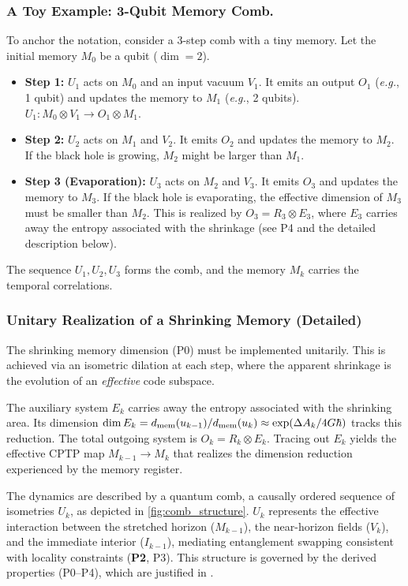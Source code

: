 \documentclass[11pt,a4paper]{article}
\newcommand{\Ptwo}{\textbf{P2}\xspace}
\newcommand{\eg}{\textit{e.g.}\xspace}
\theoremstyle{plain}
\theoremstyle{definition}
\theoremstyle{remark}
\begin{document}
\subsubsection{A Toy Example: 3-Qubit Memory Comb.}
To anchor the notation, consider a 3-step comb with a tiny memory. Let the initial memory $M_0$ be a qubit ($\dim=2$).
\begin{itemize}
    \item \textbf{Step 1:} $U_1$ acts on $M_0$ and an input vacuum $V_1$. It emits an output $O_1$ (\eg, 1 qubit) and updates the memory to $M_1$ (\eg, 2 qubits). $U_1: M_0 \otimes V_1 \to O_1 \otimes M_1$.
    \item \textbf{Step 2:} $U_2$ acts on $M_1$ and $V_2$. It emits $O_2$ and updates the memory to $M_2$. If the black hole is growing, $M_2$ might be larger than $M_1$.
    \item \textbf{Step 3 (Evaporation):} $U_3$ acts on $M_2$ and $V_3$. It emits $O_3$ and updates the memory to $M_3$. If the black hole is evaporating, the effective dimension of $M_3$ must be smaller than $M_2$. This is realized by $O_3 = R_3 \otimes E_3$, where $E_3$ carries away the entropy associated with the shrinkage (see P4 and the detailed description below).
\end{itemize}
The sequence $U_1, U_2, U_3$ forms the comb, and the memory $M_k$ carries the temporal correlations.

\subsubsection{Unitary Realization of a Shrinking Memory (Detailed)}
The shrinking memory dimension (P0) must be implemented unitarily. This is achieved via an isometric dilation at each step, where the apparent shrinkage is the evolution of an \emph{effective} code subspace.

The auxiliary system $E_k$ carries away the entropy associated with the shrinking area. Its dimension $\dim E_k = d_{\rm mem}(u_{k-1}) / d_{\rm mem}(u_k) \approx \exp(\Delta A_k / 4G\hbar)$ tracks this reduction. The total outgoing system is $O_k = R_k \otimes E_k$. Tracing out $E_k$ yields the effective CPTP map $M_{k-1}\!\to\!M_k$ that realizes the dimension reduction experienced by the memory register.

The dynamics are described by a quantum comb, a causally ordered sequence of isometries $U_k$, as depicted in \cref{fig:comb_structure}. $U_k$ represents the effective interaction between the stretched horizon ($M_{k-1}$), the near-horizon fields ($V_k$), and the immediate interior ($I_{k-1}$), mediating entanglement swapping consistent with locality constraints (\Ptwo, P3). This structure is governed by the derived properties (P0--P4), which are justified in .
\end{document}
